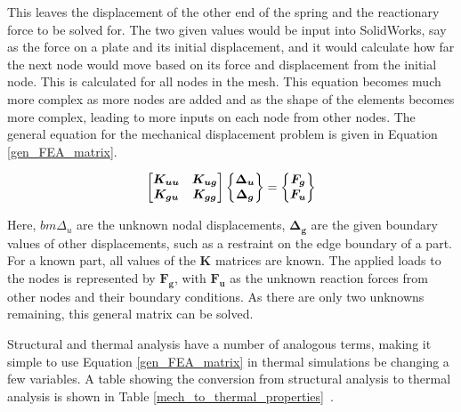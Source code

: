 This leaves the displacement of the other end of the spring and the reactionary force to be solved for. The two given values would be input into SolidWorks, say as the force on a plate and its initial displacement, and it would calculate how far the next node would move based on its force and displacement from the initial node. This is calculated for all nodes in the mesh. This equation becomes much more complex as more nodes are added and as the shape of the elements becomes more complex, leading to more inputs on each node from other nodes. The general equation for the mechanical displacement problem is given in Equation \ref{gen_FEA_matrix}.

\begin{equation} \label{gen_FEA_matrix}
\begingroup \boldmath
    \begin{bmatrix}
        K_{uu} & K_{ug} \\
        K_{gu} & K_{gg}
    \end{bmatrix}
    \begin{Bmatrix}
        \Delta_u \\
        \Delta_g \\
    \end{Bmatrix}
    =
    \begin{Bmatrix}
        F_g \\
        F_u \\
    \end{Bmatrix}
\endgroup
\end{equation}

Here, $bm{\Delta_u}$ are the unknown nodal displacements, $\bm{\Delta_g}$ are the given boundary values of other displacements, such as a restraint on the edge boundary of a part. For a known part, all values of the $\bm{K}$ matrices are known. The applied loads to the nodes is represented by $\bm{F_g}$, with $\bm{F_u}$ as the unknown reaction forces from other nodes and their boundary conditions. As there are only two unknowns remaining, this general matrix can be solved. 

Structural and thermal analysis have a number of analogous terms, making it simple to use Equation \ref{gen_FEA_matrix} in thermal simulations be changing a few variables. A table showing the conversion from structural analysis to thermal analysis is shown in Table \ref{mech_to_thermal_properties}~\citep{FEA_SW}.

